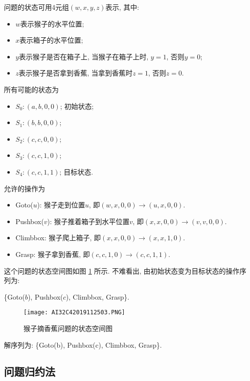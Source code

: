 \begin{result}
问题的状态可用4元组$(w, x, y, z)$表示, 其中:
\begin{itemize}
    \item $w$表示猴子的水平位置;
    \item $x$表示箱子的水平位置;
    \item $y$表示猴子是否在箱子上, 当猴子在箱子上时, $y=1$, 否则$y=0$;
    \item $z$表示猴子是否拿到香蕉, 当拿到香蕉时$z=1$, 否则$z=0$.
\end{itemize}
所有可能的状态为
\begin{itemize}
    \item $S_0: (a, b, 0, 0)$;    初始状态;
    \item $S_1: (b, b, 0, 0)$;
    \item $S_2: (c, c, 0, 0)$;
    \item $S_3: (c, c, 1, 0)$;
    \item $S_4: (c, c, 1, 1)$;    目标状态.
\end{itemize}
允许的操作为
\begin{itemize}
    \item Goto($u$): 猴子走到位置$u$, 即$(w, x, 0, 0) \rightarrow (u, x, 0, 0)$.
    \item Pushbox($v$): 猴子推着箱子到水平位置$v$, 即$(x, x, 0, 0) \rightarrow (v, v, 0, 0)$.
    \item Climbbox: 猴子爬上箱子, 即$(x, x, 0, 0) \rightarrow (x, x, 1, 0)$.
    \item Grasp: 猴子拿到香蕉, 即$(c, c, 1, 0 ) \rightarrow (c, c, 1, 1)$.
\end{itemize}
这个问题的状态空间图如图 \ref{AI32fig2019120224} 所示. 不难看出, 由初始状态变为目标状态的操作序列为:
\begin{center}
  \{Goto($b$), Pushbox($c$), Climbbox, Grasp\}.
\end{center}
\begin{figure}[H]
\centering
\texttt{[image: AI32C42019112503.PNG]}
\caption{猴子摘香蕉问题的状态空间图}
\label{AI32fig2019120224}
\end{figure}
解序列为: \{Goto(b), Pushbox(c), Climbbox, Grasp\}.
\end{result}
\subsection{问题归约法}
